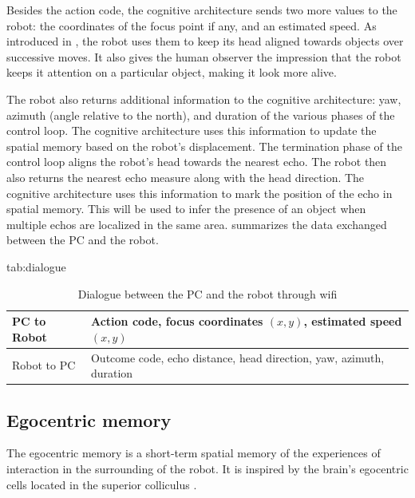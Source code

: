 \documentclass[pmlr]{jmlr}%
\begin{document}
Besides the action code, the cognitive architecture sends two more values to the robot: the coordinates of the focus point if any, and an estimated speed. 
As introduced in , the robot uses them to keep its head aligned towards objects over successive moves. 
It also gives the human observer the impression that the robot keeps it attention on a particular object, making it look more alive. 

The robot also returns additional information to the cognitive architecture: yaw, azimuth (angle relative to the north), and duration of the various phases of the control loop. 
The cognitive architecture uses this information to update the spatial memory based on the robot's displacement. 
The termination phase of the control loop aligns the robot's head towards the nearest echo. 
The robot then also returns the nearest echo measure along with the head direction. 
The cognitive architecture uses this information to mark the position of the echo in spatial memory. 
This will be used to infer the presence of an object when multiple echos are localized in the same area. 
 summarizes the data exchanged between the PC and the robot.

\begin{table}[htbp]
	\floatconts
	{tab:dialogue}%
	{\caption{Dialogue between the PC and the robot through wifi}}%
	{\begin{tabular}{l|l}
			\toprule
			PC to Robot & Action code, focus coordinates $(x, y)$, estimated speed $(x, y)$\\
			\midrule
			Robot to PC & Outcome code, echo distance, head direction, yaw, azimuth, duration\\
			\bottomrule
	\end{tabular}}
\end{table}

\subsection{Egocentric memory}

The egocentric memory is a short-term spatial memory of the experiences of interaction in the surrounding of the robot. 
It is inspired by the brain's egocentric cells located in the superior colliculus \citep{grieves_representation_2017}.
\end{document}
